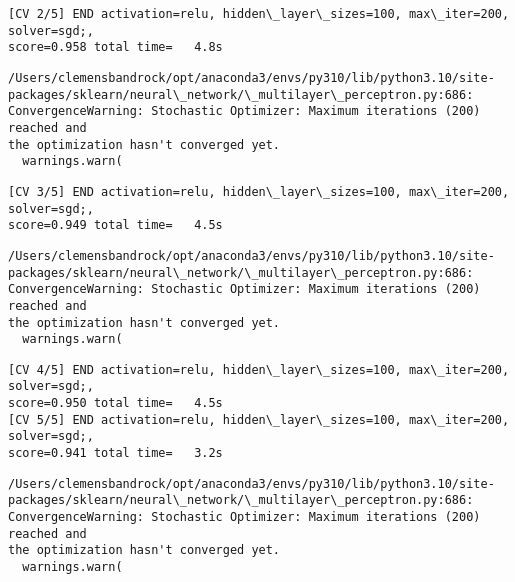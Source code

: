 \documentclass[11pt]{article}
\begin{document}
    \begin{Verbatim}[commandchars=\\\{\}]
[CV 2/5] END activation=relu, hidden\_layer\_sizes=100, max\_iter=200, solver=sgd;,
score=0.958 total time=   4.8s
    \end{Verbatim}

    \begin{Verbatim}[commandchars=\\\{\}]
/Users/clemensbandrock/opt/anaconda3/envs/py310/lib/python3.10/site-
packages/sklearn/neural\_network/\_multilayer\_perceptron.py:686:
ConvergenceWarning: Stochastic Optimizer: Maximum iterations (200) reached and
the optimization hasn't converged yet.
  warnings.warn(
    \end{Verbatim}

    \begin{Verbatim}[commandchars=\\\{\}]
[CV 3/5] END activation=relu, hidden\_layer\_sizes=100, max\_iter=200, solver=sgd;,
score=0.949 total time=   4.5s
    \end{Verbatim}

    \begin{Verbatim}[commandchars=\\\{\}]
/Users/clemensbandrock/opt/anaconda3/envs/py310/lib/python3.10/site-
packages/sklearn/neural\_network/\_multilayer\_perceptron.py:686:
ConvergenceWarning: Stochastic Optimizer: Maximum iterations (200) reached and
the optimization hasn't converged yet.
  warnings.warn(
    \end{Verbatim}

    \begin{Verbatim}[commandchars=\\\{\}]
[CV 4/5] END activation=relu, hidden\_layer\_sizes=100, max\_iter=200, solver=sgd;,
score=0.950 total time=   4.5s
[CV 5/5] END activation=relu, hidden\_layer\_sizes=100, max\_iter=200, solver=sgd;,
score=0.941 total time=   3.2s
    \end{Verbatim}

    \begin{Verbatim}[commandchars=\\\{\}]
/Users/clemensbandrock/opt/anaconda3/envs/py310/lib/python3.10/site-
packages/sklearn/neural\_network/\_multilayer\_perceptron.py:686:
ConvergenceWarning: Stochastic Optimizer: Maximum iterations (200) reached and
the optimization hasn't converged yet.
  warnings.warn(
    \end{Verbatim}
\end{document}
